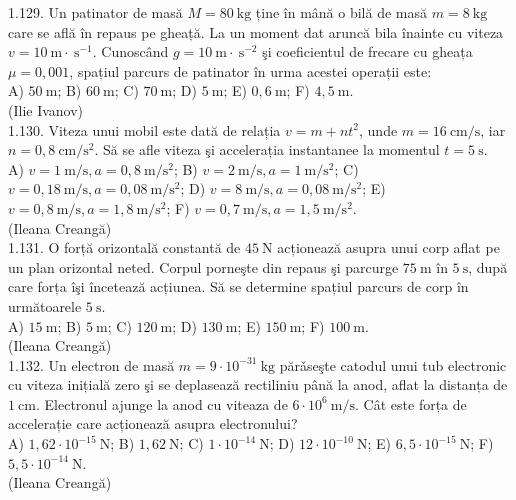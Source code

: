 1.129. Un patinator de masă $M=80 \mathrm{~kg}$ ține în mână o bilă de masă $m=8 \mathrm{~kg}$ care se află în repaus pe gheață. La un moment dat aruncă bila înainte cu viteza $v=10 \mathrm{~m} \cdot \mathrm{~s}^{-1}$. Cunoscând $g=10 \mathrm{~m} \cdot \mathrm{~s}^{-2}$ şi coeficientul de frecare cu gheața $\mu=0,001$, spațiul parcurs de patinator în urma acestei operații este:\\ A) $50 \mathrm{~m}$; B) $60 \mathrm{~m}$; C) $70 \mathrm{~m}$; D) $5 \mathrm{~m}$; E) $0,6 \mathrm{~m}$; F) $4,5 \mathrm{~m}$.\\ (Ilie Ivanov)\\

1.130. Viteza unui mobil este dată de relația $v=m+n t^{2}$, unde $m=16 \mathrm{~cm} / \mathrm{s}$, iar $n=0,8 \mathrm{~cm} / \mathrm{s}^{2}$. Să se afle viteza şi accelerația instantanee la momentul $t=5 \mathrm{~s}$.\\ A) $v=1 \mathrm{~m} / \mathrm{s}, a=0,8 \mathrm{~m} / \mathrm{s}^{2}$; B) $v=2 \mathrm{~m} / \mathrm{s}, a=1 \mathrm{~m} / \mathrm{s}^{2}$; C) $v=0,18 \mathrm{~m} / \mathrm{s}, a=0,08 \mathrm{~m} / \mathrm{s}^{2}$; D) $v=8 \mathrm{~m} / \mathrm{s}, a=0,08 \mathrm{~m} / \mathrm{s}^{2}$; E) $v=0,8 \mathrm{~m} / \mathrm{s}, a=1,8 \mathrm{~m} / \mathrm{s}^{2}$; F) $v=0,7 \mathrm{~m} / \mathrm{s}, a=1,5 \mathrm{~m} / \mathrm{s}^{2}$.\\ (Ileana Creangă)\\

1.131. O forță orizontală constantă de $45 \mathrm{~N}$ acționează asupra unui corp aflat pe un plan orizontal neted. Corpul porneşte din repaus şi parcurge $75 \mathrm{~m}$ în $5 \mathrm{~s}$, după care forța îşi încetează acțiunea. Să se determine spațiul parcurs de corp în următoarele $5 \mathrm{~s}$.\\ A) $15 \mathrm{~m}$; B) $5 \mathrm{~m}$; C) $120 \mathrm{~m}$; D) $130 \mathrm{~m}$; E) $150 \mathrm{~m}$; F) $100 \mathrm{~m}$.\\ (Ileana Creangă)\\

1.132. Un electron de masă $m=9 \cdot 10^{-31} \mathrm{~kg}$ părǎseşte catodul unui tub electronic cu viteza inițială zero şi se deplasează rectiliniu până la anod, aflat la distanța de $1 \mathrm{~cm}$. Electronul ajunge la anod cu viteaza de $6 \cdot 10^{6} \mathrm{~m} / \mathrm{s}$. Cât este forța de accelerație care acționează asupra electronului?\\ A) $1,62 \cdot 10^{-15} \mathrm{~N}$; B) $1,62 \mathrm{~N}$; C) $1 \cdot 10^{-14} \mathrm{~N}$; D) $12 \cdot 10^{-10} \mathrm{~N}$; E) $6,5 \cdot 10^{-15} \mathrm{~N}$; F) $5,5 \cdot 10^{-14} \mathrm{~N}$.\\ (Ileana Creangă)\\

